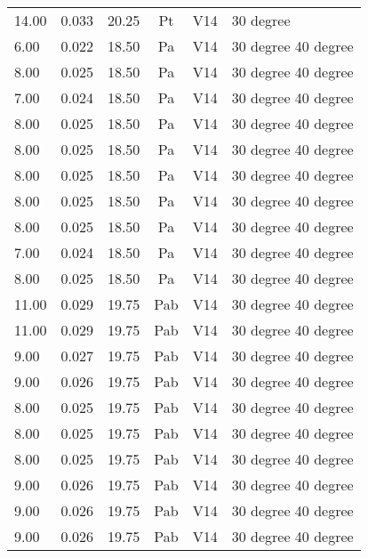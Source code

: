 \begin{table}[t]
\begin{tabular}{l | l | l | c | c | l}
14.00          & 0.033           & 20.25  & Pt       & V14    & 30 degree           \\
6.00           & 0.022           & 18.50  & Pa       & V14    & 30 degree 40 degree \\
8.00           & 0.025           & 18.50  & Pa       & V14    & 30 degree 40 degree \\
7.00           & 0.024           & 18.50  & Pa       & V14    & 30 degree 40 degree \\
8.00           & 0.025           & 18.50  & Pa       & V14    & 30 degree 40 degree \\
8.00           & 0.025           & 18.50  & Pa       & V14    & 30 degree 40 degree \\
8.00           & 0.025           & 18.50  & Pa       & V14    & 30 degree 40 degree \\
8.00           & 0.025           & 18.50  & Pa       & V14    & 30 degree 40 degree \\
8.00           & 0.025           & 18.50  & Pa       & V14    & 30 degree 40 degree \\
7.00           & 0.024           & 18.50  & Pa       & V14    & 30 degree 40 degree \\
8.00           & 0.025           & 18.50  & Pa       & V14    & 30 degree 40 degree \\
11.00          & 0.029           & 19.75  & Pab      & V14    & 30 degree 40 degree \\
11.00          & 0.029           & 19.75  & Pab      & V14    & 30 degree 40 degree \\
9.00           & 0.027           & 19.75  & Pab      & V14    & 30 degree 40 degree \\
9.00           & 0.026           & 19.75  & Pab      & V14    & 30 degree 40 degree \\
8.00           & 0.025           & 19.75  & Pab      & V14    & 30 degree 40 degree \\
8.00           & 0.025           & 19.75  & Pab      & V14    & 30 degree 40 degree \\
8.00           & 0.025           & 19.75  & Pab      & V14    & 30 degree 40 degree \\
9.00           & 0.026           & 19.75  & Pab      & V14    & 30 degree 40 degree \\
9.00           & 0.026           & 19.75  & Pab      & V14    & 30 degree 40 degree \\
9.00           & 0.026           & 19.75  & Pab      & V14    & 30 degree 40 degree \\
\end{tabular}
\end{table}

